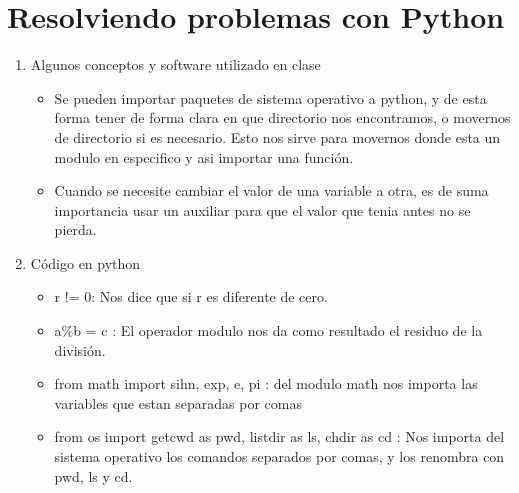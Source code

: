 \documentclass{book}
\begin{document}
	\section{Resolviendo problemas con Python}%
\begin{flushright}
	\date{17 de enero de 2019}
\end{flushright}

\begin{enumerate}%
	\item Algunos conceptos y software utilizado en clase%
	\begin{itemize}
		\item Se pueden importar paquetes de sistema operativo a python, y de esta forma tener de forma clara en que directorio nos encontramos, o movernos de directorio si es necesario. Esto nos sirve para movernos donde esta un modulo en especifico y asi importar una función.
		\item Cuando se necesite cambiar el valor de una variable a otra, es de suma importancia usar un auxiliar para que el valor que tenia antes no se pierda.	
		
	\end{itemize}
	
	\item Código en python%
	\begin{itemize}%
		\item r != 0: Nos dice que si r es diferente de cero.
		\item a\%b = c : El operador modulo nos da como resultado el residuo de la división.
		\item from math import sihn, exp, e, pi : del modulo math nos importa las variables que estan separadas por comas
		\item from os import getcwd as pwd, listdir as ls, chdir as cd : Nos importa del sistema operativo los comandos separados por comas, y los renombra con pwd, ls y cd.
		
		
		

\end{itemize}
\end{enumerate}
\end{document}
